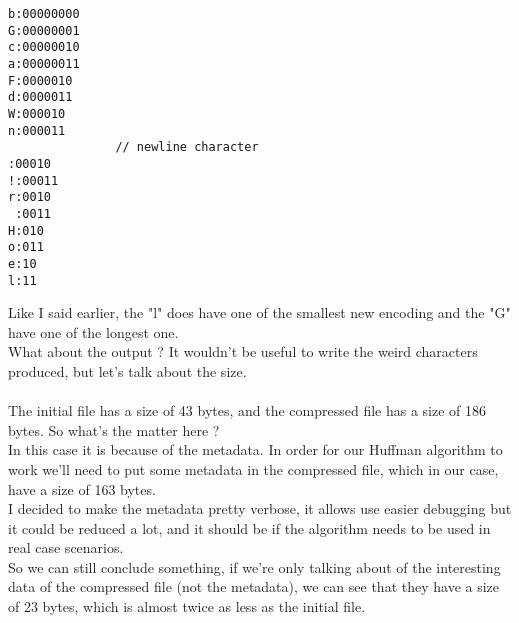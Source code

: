 \begin{verbatim}
b:00000000
G:00000001
c:00000010
a:00000011
F:0000010
d:0000011
W:000010
n:000011
               // newline character
:00010
!:00011
r:0010
 :0011
H:010
o:011
e:10
l:11
\end{verbatim}
Like I said earlier, the "l" does have one of the smallest new encoding and the "G" have one of the longest one.\\
What about the output ? It wouldn't be useful to write the weird characters produced, but let's talk about the size.\\
\\
The initial file has a size of 43 bytes, and the compressed file has a size of 186 bytes. So what's the matter here ?\\
In this case it is because of the metadata. In order for our Huffman algorithm to work we'll need to put some metadata in the compressed file, which in our case, have a size of 163 bytes.\\
I decided to make the metadata pretty verbose, it allows use easier debugging but it could be reduced a lot, and it should be if the algorithm needs to be used in real case scenarios.\\
So we can still conclude something, if we're only talking about of the interesting data of the compressed file (not the metadata), we can see that they have a size of 23 bytes, which is almost twice as less as the initial file.
